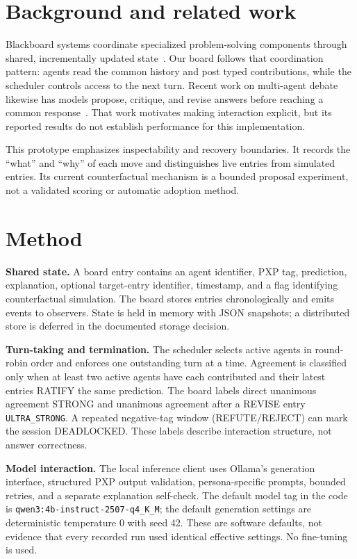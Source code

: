 \documentclass[11pt,a4paper,twocolumn]{article}
\begin{document}
\section{Background and related work}
Blackboard systems coordinate specialized problem-solving components through shared, incrementally updated state~\cite{corkill1991}. Our board follows that coordination pattern: agents read the common history and post typed contributions, while the scheduler controls access to the next turn. Recent work on multi-agent debate likewise has models propose, critique, and revise answers before reaching a common response~\cite{du2023}. That work motivates making interaction explicit, but its reported results do not establish performance for this implementation.

This prototype emphasizes inspectability and recovery boundaries. It records the ``what'' and ``why'' of each move and distinguishes live entries from simulated entries. Its current counterfactual mechanism is a bounded proposal experiment, not a validated scoring or automatic adoption method.

\section{Method}
\textbf{Shared state.} A board entry contains an agent identifier, PXP tag, prediction, explanation, optional target-entry identifier, timestamp, and a flag identifying counterfactual simulation. The board stores entries chronologically and emits events to observers. State is held in memory with JSON snapshots; a distributed store is deferred in the documented storage decision.

\textbf{Turn-taking and termination.} The scheduler selects active agents in round-robin order and enforces one outstanding turn at a time. Agreement is classified only when at least two active agents have each contributed and their latest entries RATIFY the same prediction. The board labels direct unanimous agreement STRONG and unanimous agreement after a REVISE entry \texttt{ULTRA\_STRONG}. A repeated negative-tag window (REFUTE/REJECT) can mark the session DEADLOCKED. These labels describe interaction structure, not answer correctness.

\textbf{Model interaction.} The local inference client uses Ollama's generation interface, structured PXP output validation, persona-specific prompts, bounded retries, and a separate explanation self-check. The default model tag in the code is \texttt{qwen3:4b-instruct-2507-q4\_K\_M}; the default generation settings are deterministic temperature 0 with seed 42. These are software defaults, not evidence that every recorded run used identical effective settings. No fine-tuning is used.
\end{document}
